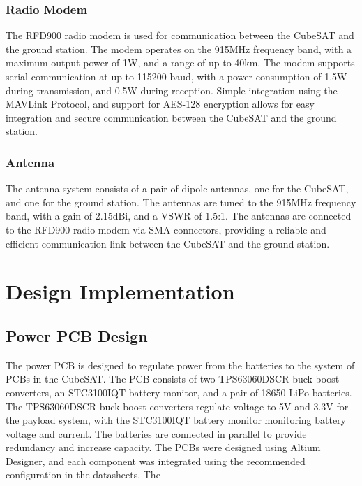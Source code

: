 \documentclass{report}
\begin{document}
            \subsection{Radio Modem}
                The RFD900 radio modem is used for communication between the CubeSAT and the ground station.
                The modem operates on the 915MHz frequency band, with a maximum output power of 1W, and a range of up to 40km.
                The modem supports serial communication at up to 115200 baud, with a power consumption of 1.5W during transmission,
                and 0.5W during reception.
                Simple integration using the MAVLink Protocol, and 
                support for AES-128 encryption allows for easy integration and secure communication between the CubeSAT and the ground station.
            \subsection{Antenna}
                The antenna system consists of a pair of dipole antennas, one for the CubeSAT, and one for the ground station.
                The antennas are tuned to the 915MHz frequency band, with a gain of 2.15dBi, and a VSWR of 1.5:1.
                The antennas are connected to the RFD900 radio modem via SMA connectors, providing a reliable and efficient
                communication link between the CubeSAT and the ground station.
    \chapter{Design Implementation}
        \section{Power PCB Design}
            The power PCB is designed to regulate power from the batteries to the system of PCBs in the CubeSAT.
            The PCB consists of two TPS63060DSCR buck-boost converters, an STC3100IQT battery monitor, and a pair of 18650 LiPo batteries.
            The TPS63060DSCR buck-boost converters regulate voltage to 5V and 3.3V for the payload system, with the STC3100IQT battery monitor
            monitoring battery voltage and current.
            The batteries are connected in parallel to provide redundancy and increase capacity. The PCBs were designed using Altium Designer,
            and each component was integrated using the recommended configuration in the datasheets. 
            The 
\end{document}
